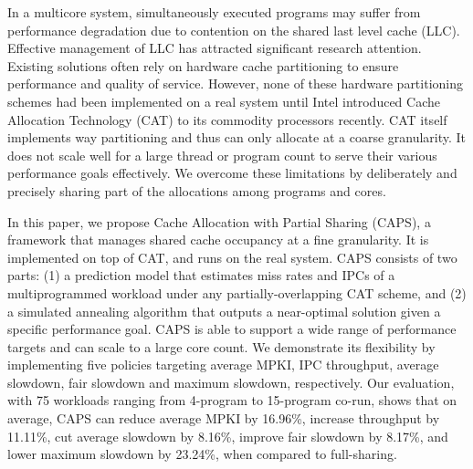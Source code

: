 \begin{eabstract}
In a multicore system, simultaneously executed programs may suffer from performance degradation due to contention on the shared last level cache (LLC). Effective management of LLC has attracted significant research attention. Existing solutions often rely on hardware cache partitioning to ensure performance and quality of service. However, none of these hardware partitioning schemes had been implemented on a real system until Intel introduced Cache Allocation Technology (CAT) to its commodity processors recently. CAT itself implements way partitioning and thus can only allocate at a coarse granularity. It does not scale well for a large thread or program count to serve their various performance goals effectively. We overcome these limitations by deliberately and precisely sharing part of the allocations among programs and cores.

In this paper, we propose Cache Allocation with Partial Sharing (CAPS), a framework that manages shared cache occupancy at a fine granularity. It is implemented on top of CAT, and runs on the real system. CAPS consists of two parts: (1) a prediction model that estimates miss rates and IPCs of a multiprogrammed workload under any partially-overlapping CAT scheme, and (2) a simulated annealing algorithm that outputs a near-optimal solution given a specific performance goal. CAPS is able to support a wide range of performance targets and can scale to a large core count. We demonstrate its flexibility by implementing five policies targeting average MPKI, IPC throughput, average slowdown, fair slowdown and maximum slowdown, respectively. Our evaluation, with 75 workloads ranging from 4-program to 15-program co-run, shows that on average, CAPS can reduce average MPKI by 16.96\%, increase throughput by 11.11\%, cut average slowdown by 8.16\%, improve fair slowdown by 8.17\%, and lower maximum slowdown by 23.24\%, when compared to full-sharing.
\end{eabstract}

